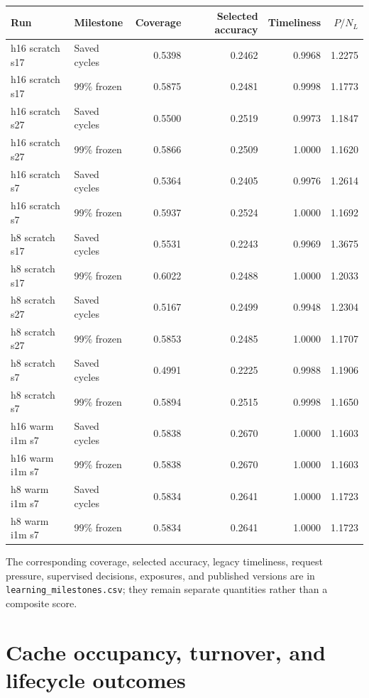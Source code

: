\documentclass[10pt]{article}
\begin{document}
\begin{center}
\scriptsize
\begin{longtable}{llrrrr}
\toprule
Run & Milestone & Coverage & Selected accuracy & Timeliness & $P/N_L$ \\
\midrule
\endhead
h16 scratch s17 & Saved cycles & 0.5398 & 0.2462 & 0.9968 & 1.2275 \\
h16 scratch s17 & 99\% frozen & 0.5875 & 0.2481 & 0.9998 & 1.1773 \\
h16 scratch s27 & Saved cycles & 0.5500 & 0.2519 & 0.9973 & 1.1847 \\
h16 scratch s27 & 99\% frozen & 0.5866 & 0.2509 & 1.0000 & 1.1620 \\
h16 scratch s7 & Saved cycles & 0.5364 & 0.2405 & 0.9976 & 1.2614 \\
h16 scratch s7 & 99\% frozen & 0.5937 & 0.2524 & 1.0000 & 1.1692 \\
h8 scratch s17 & Saved cycles & 0.5531 & 0.2243 & 0.9969 & 1.3675 \\
h8 scratch s17 & 99\% frozen & 0.6022 & 0.2488 & 1.0000 & 1.2033 \\
h8 scratch s27 & Saved cycles & 0.5167 & 0.2499 & 0.9948 & 1.2304 \\
h8 scratch s27 & 99\% frozen & 0.5853 & 0.2485 & 1.0000 & 1.1707 \\
h8 scratch s7 & Saved cycles & 0.4991 & 0.2225 & 0.9988 & 1.1906 \\
h8 scratch s7 & 99\% frozen & 0.5894 & 0.2515 & 0.9998 & 1.1650 \\
h16 warm i1m s7 & Saved cycles & 0.5838 & 0.2670 & 1.0000 & 1.1603 \\
h16 warm i1m s7 & 99\% frozen & 0.5838 & 0.2670 & 1.0000 & 1.1603 \\
h8 warm i1m s7 & Saved cycles & 0.5834 & 0.2641 & 1.0000 & 1.1723 \\
h8 warm i1m s7 & 99\% frozen & 0.5834 & 0.2641 & 1.0000 & 1.1723 \\
\bottomrule
\end{longtable}
\end{center}

The corresponding coverage, selected accuracy, legacy timeliness, request pressure, supervised decisions, exposures, and published versions are in \texttt{learning\_milestones.csv}; they remain separate quantities rather than a composite score.

\section{Cache occupancy, turnover, and lifecycle outcomes}
\end{document}
